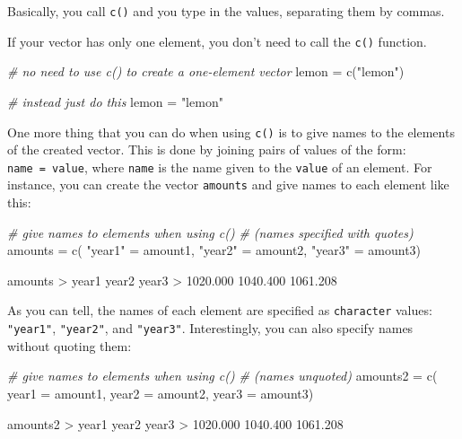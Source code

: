 \documentclass[
]{book}
\newenvironment{Shaded}{\begin{snugshade}}{\end{snugshade}}
\newcommand{\AttributeTok}[1]{\textcolor[rgb]{0.77,0.63,0.00}{#1}}
\newcommand{\CommentTok}[1]{\textcolor[rgb]{0.56,0.35,0.01}{\textit{#1}}}
\newcommand{\FloatTok}[1]{\textcolor[rgb]{0.00,0.00,0.81}{#1}}
\newcommand{\FunctionTok}[1]{\textcolor[rgb]{0.00,0.00,0.00}{#1}}
\newcommand{\NormalTok}[1]{#1}
\newcommand{\OtherTok}[1]{\textcolor[rgb]{0.56,0.35,0.01}{#1}}
\newcommand{\SpecialCharTok}[1]{\textcolor[rgb]{0.00,0.00,0.00}{#1}}
\newcommand{\StringTok}[1]{\textcolor[rgb]{0.31,0.60,0.02}{#1}}
\begin{document}
Basically, you call \texttt{c()} and you type in the values, separating them by
commas.

If your vector has only one element, you don't need to call the \texttt{c()} function.

\begin{Shaded}
\begin{Highlighting}[]
\CommentTok{\# no need to use c() to create a one{-}element vector}
\NormalTok{lemon }\OtherTok{=} \FunctionTok{c}\NormalTok{(}\StringTok{"lemon"}\NormalTok{)}

\CommentTok{\# instead just do this}
\NormalTok{lemon }\OtherTok{=} \StringTok{"lemon"}
\end{Highlighting}
\end{Shaded}

One more thing that you can do when using \texttt{c()} is to give names to the
elements of the created vector. This is done by joining pairs of
values of the form: \texttt{\textquotesingle{}name\textquotesingle{}\ =\ value}, where \texttt{\textquotesingle{}name\textquotesingle{}} is the name given to the
\texttt{value} of an element. For instance, you can create the vector
\texttt{amounts} and give names to each element like this:

\begin{Shaded}
\begin{Highlighting}[]
\CommentTok{\# give names to elements when using c()}
\CommentTok{\# (names specified with quotes)}
\NormalTok{amounts }\OtherTok{=} \FunctionTok{c}\NormalTok{(}
  \StringTok{"year1"} \OtherTok{=}\NormalTok{ amount1, }
  \StringTok{"year2"} \OtherTok{=}\NormalTok{ amount2, }
  \StringTok{"year3"} \OtherTok{=}\NormalTok{ amount3)}

\NormalTok{amounts}
\SpecialCharTok{\textgreater{}}\NormalTok{    year1    year2    year3 }
\SpecialCharTok{\textgreater{}} \FloatTok{1020.000} \FloatTok{1040.400} \FloatTok{1061.208}
\end{Highlighting}
\end{Shaded}

As you can tell, the names of each element are specified as \texttt{character} values:
\texttt{"year1"}, \texttt{"year2"}, and \texttt{"year3"}. Interestingly, you can also
specify names without quoting them:

\begin{Shaded}
\begin{Highlighting}[]
\CommentTok{\# give names to elements when using c()}
\CommentTok{\# (names unquoted)}
\NormalTok{amounts2 }\OtherTok{=} \FunctionTok{c}\NormalTok{(}
  \AttributeTok{year1 =}\NormalTok{ amount1, }
  \AttributeTok{year2 =}\NormalTok{ amount2, }
  \AttributeTok{year3 =}\NormalTok{ amount3)}

\NormalTok{amounts2}
\SpecialCharTok{\textgreater{}}\NormalTok{    year1    year2    year3 }
\SpecialCharTok{\textgreater{}} \FloatTok{1020.000} \FloatTok{1040.400} \FloatTok{1061.208}
\end{Highlighting}
\end{Shaded}
\end{document}
